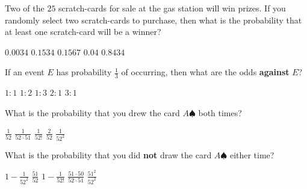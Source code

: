 \documentclass[answers,12pt]{exam}
\begin{document}
\begin{questions}
\question Two of the $25$ scratch-cards for sale at the gas station
will win prizes. If you randomly select two scratch-cards to purchase,
then what is the probability that at least one scratch-card 
will be a winner?\\
\begin{oneparchoices}
\choice $0.0034$ %
\choice $0.1534$ %
\correctchoice $0.1567$
\choice $0.04$ %
\choice $0.8434$ %
\end{oneparchoices}

\question If an event $E$ has probability $\frac{1}{3}$
of occurring, then what are the odds {\bf against} $E$?\\
\begin{oneparchoices}
\choice $1:1$
\choice $1:2$
\choice $1:3$
\correctchoice $2:1$
\choice $3:1$
\end{oneparchoices}


\question\label{FirstDeck} What is the probability that you
drew the card $A\spadesuit$ both times?\\
\begin{oneparchoices}
\choice $\frac{1}{52}$
\choice $\frac{1}{52\cdot 51}$
\choice $\frac{1}{52!}$
\choice $\frac{2}{52}$
\correctchoice $\frac{1}{52^2}$
\end{oneparchoices}

\question\label{LastDeck} What is the probability that you
did {\bf not} draw the card $A\spadesuit$ either time?\\
\begin{oneparchoices}
\choice $1-\frac{1}{52^2}$
\choice $\frac{51}{52}$
\choice $1-\frac{1}{52!}$
\choice $\frac{51\cdot 50}{52\cdot 51}$
\correctchoice $\frac{51^2}{52^2}$
\end{oneparchoices}


\end{questions}
\end{document}
